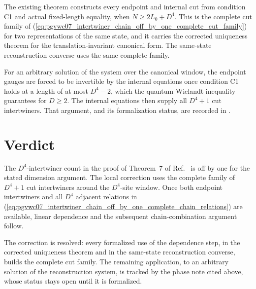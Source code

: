 \documentclass{article}
\begin{document}
The existing theorem
constructs every endpoint and internal cut from condition C1 and actual
fixed-length equality, when $N\ge2L_0+D^4$. This is the complete cut family
of (\ref{eq:pgvwc07_intertwiner_chain_off_by_one_complete_cut_family}) for
two representations of the same state, and it carries the corrected
uniqueness theorem for the translation-invariant canonical form. The
same-state reconstruction converse
uses the same complete family.

For an arbitrary solution of the system over the canonical window, the
endpoint gauges are forced to be invertible by the internal equations once
condition C1 holds at a length of at most $D^4-2$, which the quantum Wielandt
inequality guarantees for $D\geq2$. The internal equations then supply all
$D^4+1$ cut intertwiners. That argument, and its formalization status, are
recorded in
.

\section{Verdict}

The $D^4$-intertwiner count in the proof of Theorem~7 of
Ref.~\cite{PerezGarcia2007Matrix} is off by one for the stated dimension
argument. The local correction uses the complete family of $D^4+1$ cut
intertwiners around the $D^4$-site window. Once both endpoint intertwiners and
all $D^4$ adjacent relations in
(\ref{eq:pgvwc07_intertwiner_chain_off_by_one_complete_chain_relations}) are
available, linear dependence and the subsequent chain-combination argument
follow.

The correction is resolved: every formalized use of the dependence step, in
the corrected uniqueness theorem and in the same-state reconstruction
converse, builds the complete cut family. The remaining application, to an
arbitrary solution of the reconstruction system, is tracked by the phase note
cited above, whose status stays open until it is formalized.



\end{document}

